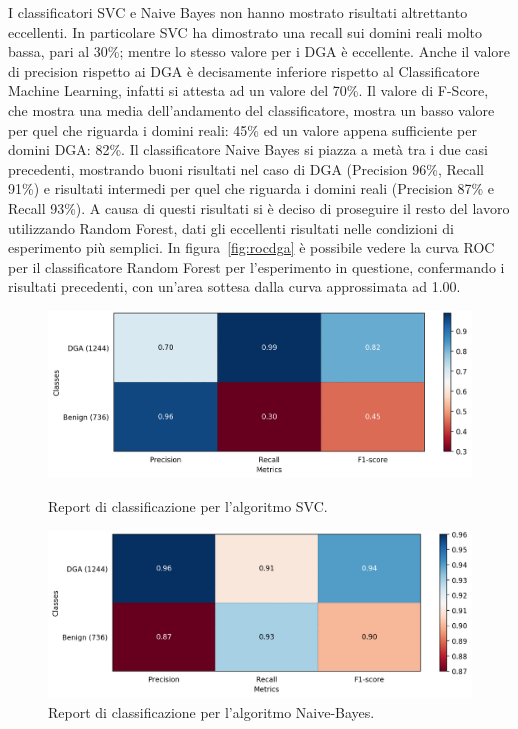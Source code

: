 I classificatori SVC e Naive Bayes non hanno mostrato risultati altrettanto eccellenti. In particolare SVC ha dimostrato una recall sui domini reali molto bassa, pari al 30\%; mentre lo stesso valore per i DGA è eccellente. Anche il valore di precision rispetto ai DGA è decisamente inferiore rispetto al Classificatore Machine Learning, infatti si attesta ad un valore del 70\%. Il valore di F-Score, che mostra una media dell'andamento del classificatore, mostra un basso valore per quel che riguarda i domini reali: 45\% ed un valore appena sufficiente per domini DGA: 82\%.
Il classificatore Naive Bayes si piazza a metà tra i due casi precedenti, mostrando buoni risultati nel caso di DGA (Precision 96\%, Recall 91\%) e risultati intermedi per quel che riguarda i domini reali (Precision 87\% e Recall 93\%). A causa di questi risultati si è deciso di proseguire il resto del lavoro utilizzando Random Forest, dati gli eccellenti risultati nelle condizioni di esperimento più semplici. 
In figura~\ref{fig:rocdga} è possibile vedere la curva ROC per il classificatore Random Forest per l'esperimento in questione, confermando i risultati precedenti, con un'area sottesa dalla curva approssimata ad 1.00.

\begin{figure}[!bp]
  	\centering
    \includegraphics[width=\columnwidth]{figures/report_SVC.png}
    \caption{Report di classificazione per l'algoritmo SVC.\label{fig:repsvc}}
	\hfill
	\vspace{3cm}
	\centering
    \includegraphics[width=\columnwidth]{figures/report_GaussianNB.png}
    \caption{Report di classificazione per l'algoritmo Naive-Bayes.\label{fig:repgnb}}
\end{figure}


